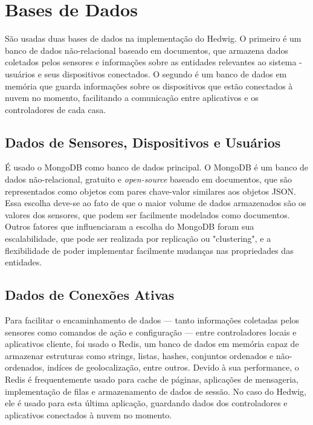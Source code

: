 \section{Bases de Dados}

São usadas duas bases de dados na implementação do Hedwig. O primeiro é um banco de dados não-relacional baseado em documentos, que armazena dados coletados pelos sensores e informações sobre as entidades relevantes ao sistema - usuários e seus dispositivos conectados. O segundo é um banco de dados em memória que guarda informações sobre os dispositivos que estão conectados à nuvem no momento, facilitando a comunicação entre aplicativos e os controladores de cada casa.


\subsection{Dados de Sensores, Dispositivos e Usuários}

É usado o MongoDB como banco de dados principal. O MongoDB é um banco de dados não-relacional, gratuito e \emph{open-source} baseado em documentos, que são representados como objetos com pares chave-valor similares aos objetos JSON. Essa escolha deve-se ao fato de que o maior volume de dados armazenados são os valores dos sensores, que podem ser facilmente modelados como documentos. Outros fatores que influenciaram a escolha do MongoDB foram sua escalabilidade, que pode ser realizada por replicação ou "clustering", e a flexibilidade de poder implementar facilmente mudanças nas propriedades das entidades.

\subsection{Dados de Conexões Ativas}

Para facilitar o encaminhamento de dados --- tanto informações coletadas pelos sensores como comandos de ação e configuração --- entre controladores locais e aplicativos cliente, foi usado o Redis, um banco de dados em memória capaz de armazenar estruturas como strings, listas, hashes, conjuntos ordenados e não-ordenados, indíces de geolocalização, entre outros. Devido à sua performance, o Redis é frequentemente usado para cache de páginas, aplicações de mensageria, implementação de filas e armazenamento de dados de sessão. No caso do Hedwig, ele é usado para esta última aplicação, guardando dados dos controladores e aplicativos conectados à nuvem no momento.

